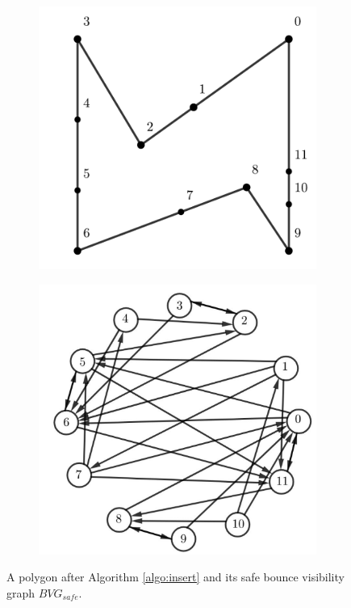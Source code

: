\documentclass[sageh,times,Review]{sagej}
\begin{document}
\begin{figure}
\centering
\begin{subfigure}{0.5\columnwidth}
\centering
\includegraphics[width=0.9\linewidth]{simple_bit_inserted.pdf}
\end{subfigure}%
\begin{subfigure}{0.5\columnwidth}
\centering
\includegraphics[width=0.9\linewidth]{simple_bit_safe_graph.pdf}
\end{subfigure}
\caption{A polygon after Algorithm \ref{algo:insert} and its safe bounce visibility graph $BVG_{safe}$. }
\label{fig:simple_bit}
\end{figure}
\end{document}
